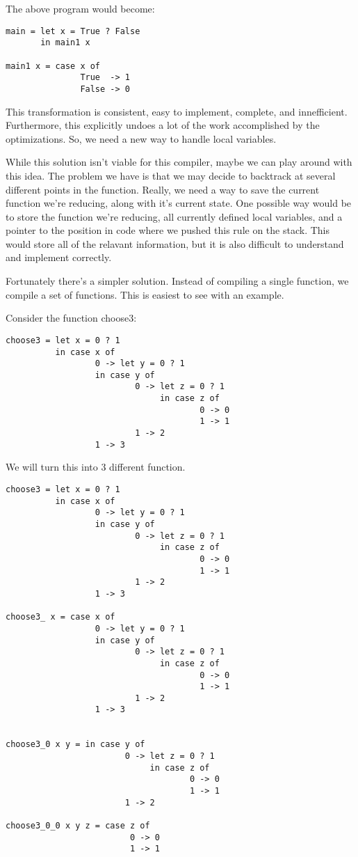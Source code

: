 The above program would become:
\begin{verbatim}
main = let x = True ? False
       in main1 x

main1 x = case x of
               True  -> 1
               False -> 0
\end{verbatim}

This transformation is consistent, easy to implement, complete, and innefficient.
Furthermore, this explicitly undoes a lot of the work accomplished by the optimizations.
So, we need a new way to handle local variables.

While this solution isn't viable for this compiler, maybe we can play around with this idea.
The problem we have is that we may decide to backtrack at several different points in the function.
Really, we need a way to save the current function we're reducing, along with it's current state.
One possible way would be to store the function we're reducing, all currently defined local variables,
and a pointer to the position in code where we pushed this rule on the stack.
This would store all of the relavant information, but it is also difficult to understand and implement correctly.

Fortunately there's a simpler solution.
Instead of compiling a single function, we compile a set of functions.
This is easiest to see with an example.

Consider the function choose3:
\begin{verbatim}
choose3 = let x = 0 ? 1
          in case x of 
                  0 -> let y = 0 ? 1
                  in case y of
                          0 -> let z = 0 ? 1
                               in case z of
                                       0 -> 0
                                       1 -> 1
                          1 -> 2
                  1 -> 3
\end{verbatim}

We will turn this into 3 different function.

\begin{verbatim}
choose3 = let x = 0 ? 1
          in case x of 
                  0 -> let y = 0 ? 1
                  in case y of
                          0 -> let z = 0 ? 1
                               in case z of
                                       0 -> 0
                                       1 -> 1
                          1 -> 2
                  1 -> 3

choose3_ x = case x of 
                  0 -> let y = 0 ? 1
                  in case y of
                          0 -> let z = 0 ? 1
                               in case z of
                                       0 -> 0
                                       1 -> 1
                          1 -> 2
                  1 -> 3


choose3_0 x y = in case y of
                        0 -> let z = 0 ? 1
                             in case z of
                                     0 -> 0
                                     1 -> 1
                        1 -> 2

choose3_0_0 x y z = case z of
                         0 -> 0
                         1 -> 1
\end{verbatim}

